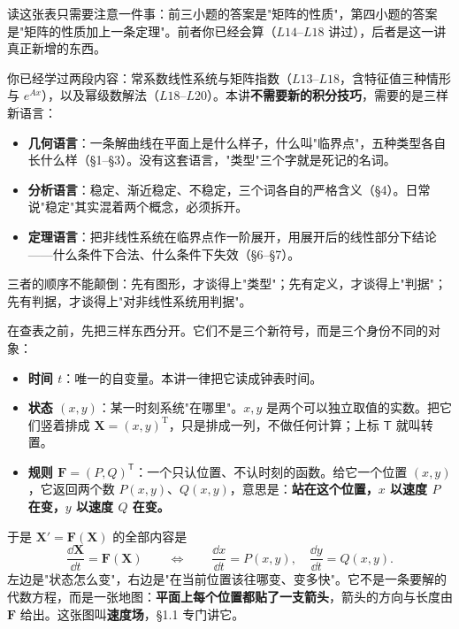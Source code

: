 \documentclass[11pt]{ctexart}
\newcommand{\X}{\mathbf{X}}\newcommand{\Y}{\mathbf{Y}}
\newcommand{\F}{\mathbf{F}}
\begin{document}
读这张表只需要注意一件事：前三小题的答案是"矩阵的性质"，第四小题的答案是"矩阵的性质加上一条定理"。前者你已经会算（$L14$--$L18$ 讲过），后者是这一讲真正新增的东西。


你已经学过两段内容：常系数线性系统与矩阵指数（$L13$--$L18$，含特征值三种情形与 $e^{Ax}$），以及幂级数解法（$L18$--$L20$）。本讲\textbf{不需要新的积分技巧}，需要的是三样新语言：

\begin{itemize}
\item \textbf{几何语言}：一条解曲线在平面上是什么样子，什么叫"临界点"，五种类型各自长什么样（§1--§3）。没有这套语言，"类型"三个字就是死记的名词。
\item \textbf{分析语言}：稳定、渐近稳定、不稳定，三个词各自的严格含义（§4）。日常说"稳定"其实混着两个概念，必须拆开。
\item \textbf{定理语言}：把非线性系统在临界点作一阶展开，用展开后的线性部分下结论——什么条件下合法、什么条件下失效（§6--§7）。
\end{itemize}

三者的顺序不能颠倒：先有图形，才谈得上"类型"；先有定义，才谈得上"判据"；先有判据，才谈得上"对非线性系统用判据"。


在查表之前，先把三样东西分开。它们不是三个新符号，而是三个身份不同的对象：

\begin{itemize}
\item \textbf{时间 $t$}：唯一的自变量。本讲一律把它读成钟表时间。
\item \textbf{状态 $(x,y)$}：某一时刻系统"在哪里"。$x,y$ 是两个可以独立取值的实数。把它们竖着排成 $\X=(x,y)^{\mathrm T}$，只是排成一列，不做任何计算；上标 $\mathsf T$ 就叫转置。
\item \textbf{规则 $\F=(P,Q)^{\mathsf T}$}：一个只认位置、不认时刻的函数。给它一个位置 $(x,y)$，它返回两个数 $P(x,y)$、$Q(x,y)$，意思是：\textbf{站在这个位置，$x$ 以速度 $P$ 在变，$y$ 以速度 $Q$ 在变。}
\end{itemize}

于是 $\X'=\F(\X)$ 的全部内容是
\[
\frac{\dd\X}{\dd t}=\F(\X)
\qquad\Longleftrightarrow\qquad
\frac{\dd x}{\dd t}=P(x,y),\quad
\frac{\dd y}{\dd t}=Q(x,y).
\]
左边是"状态怎么变"，右边是"在当前位置该往哪变、变多快"。它不是一条要解的代数方程，而是一张地图：\textbf{平面上每个位置都贴了一支箭头}，箭头的方向与长度由 $\F$ 给出。这张图叫\textbf{速度场}，§1.1 专门讲它。
\end{document}
